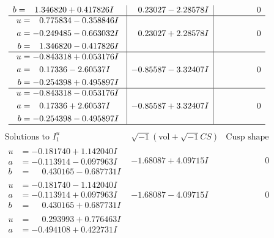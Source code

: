 \documentclass[1p]{elsarticle_modified}
\theoremstyle{definition}
\newcommand{\I}{\sqrt{-1}}
\begin{document}
$$\begin{array}{c|c|c}
\begin{aligned}
b &= \phantom{-}1.346820 + 0.417826 I\end{aligned}
 & \phantom{-}0.23027 - 2.28578 I & \phantom{-0.000000 } 0 \\ \hline\begin{aligned}
u &= \phantom{-}0.775834 - 0.358846 I \\
a &= -0.249485 - 0.663032 I \\
b &= \phantom{-}1.346820 - 0.417826 I\end{aligned}
 & \phantom{-}0.23027 + 2.28578 I & \phantom{-0.000000 } 0 \\ \hline\begin{aligned}
u &= -0.843318 + 0.053176 I \\
a &= \phantom{-}0.17336 - 2.60537 I \\
b &= -0.254398 + 0.495897 I\end{aligned}
 & -0.85587 - 3.32407 I & \phantom{-0.000000 } 0 \\ \hline\begin{aligned}
u &= -0.843318 - 0.053176 I \\
a &= \phantom{-}0.17336 + 2.60537 I \\
b &= -0.254398 - 0.495897 I\end{aligned}
 & -0.85587 + 3.32407 I & \phantom{-0.000000 } 0\\
 \hline 
 \end{array}$$\newpage$$\begin{array}{c|c|c}  
\text{Solutions to }I^u_{1}& \I (\text{vol} + \sqrt{-1}CS) & \text{Cusp shape}\\
 \hline 
\begin{aligned}
u &= -0.181740 + 1.142040 I \\
a &= -0.113914 - 0.097963 I \\
b &= \phantom{-}0.430165 - 0.687731 I\end{aligned}
 & -1.68087 + 4.09715 I & \phantom{-0.000000 } 0 \\ \hline\begin{aligned}
u &= -0.181740 - 1.142040 I \\
a &= -0.113914 + 0.097963 I \\
b &= \phantom{-}0.430165 + 0.687731 I\end{aligned}
 & -1.68087 - 4.09715 I & \phantom{-0.000000 } 0 \\ \hline\begin{aligned}
u &= \phantom{-}0.293993 + 0.776463 I \\
a &= -0.494108 + 0.422731 I \\

\end{aligned}
\end{array}$$
\end{document}
